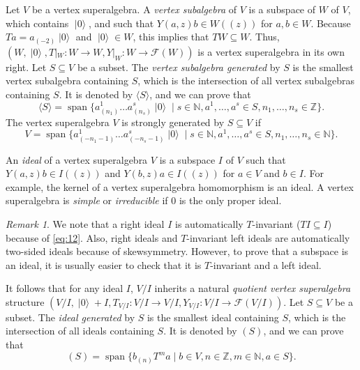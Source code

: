 \documentclass[a4paper, 12pt, reqno]{amsart}
\theoremstyle{remark}
\newtheorem{remark}[theorem]{Remark}
\numberwithin{equation}{subsection}
\DeclareMathOperator{\vspan}{span}
\DeclareMathOperator{\vac}{|0\rangle}
\begin{document}
Let $V$ be a vertex superalgebra.
A \emph{vertex subalgebra} of $V$ is a subspace of $W$ of $V$, which contains $\vac$, and such that $Y(a, z)b \in W((z))$ for $a, b \in W$.
Because $Ta = a_{(-2)}\vac$ and $\vac \in W$, this implies that $TW \subseteq W$.
Thus, $(W, \vac, T|_{W}: W \to W, Y|_{W}: W \to \mathcal{F}(W))$ is a vertex superalgebra in its own right.
Let $S \subseteq V$ be a subset.
The \emph{vertex subalgebra generated} by $S$ is the smallest vertex subalgebra containing $S$, which is the intersection of all vertex subalgebras containing $S$.
It is denoted by $\langle S \rangle$, and we can prove that
\begin{equation*}
  \langle S \rangle = \vspan\{a^1_{(n_1)}\dots a^s_{(n_s)}\vac \mid s \in \mathbb{N}, a^1, \dots, a^s \in S, n_1, \dots, n_s \in \mathbb{Z}\}.
\end{equation*}
The vertex superalgebra $V$ is strongly generated by $S \subseteq V$ if
\begin{equation*}
  V = \vspan\{a^1_{(-n_1 - 1)}\dots a^s_{(-n_s - 1)}\vac \mid s \in \mathbb{N}, a^1, \dots, a^s \in S, n_1, \dots, n_s \in \mathbb{N}\}.
\end{equation*}

An \emph{ideal} of a vertex superalgebra $V$ is a subspace $I$ of $V$ such that $Y(a, z)b \in I((z))$ and $Y(b, z)a \in I((z))$ for $a \in V$ and $b \in I$.
For example, the kernel of a vertex superalgebra homomorphism is an ideal.
A vertex superalgebra is \emph{simple} or \emph{irreducible} if $0$ is the only proper ideal.

\begin{remark}
  \label{rmk:13}
  We note that a right ideal $I$ is automatically $T$-invariant ($TI \subseteq I$) because of \eqref{eq:12}.
  Also, right ideals and $T$-invariant left ideals are automatically two-sided ideals because of skewsymmetry.
  However, to prove that a subspace is an ideal, it is usually easier to check that it is $T$-invariant and a left ideal.
\end{remark}

It follows that for any ideal $I$, $V/I$ inherits a natural \emph{quotient vertex superalgebra} structure $(V/I, \vac + I, T_{V/I}: V/I \to V/I, Y_{V/I}: V/I \to \mathcal{F}(V/I))$.
Let $S \subseteq V$ be a subset.
The \emph{ideal generated} by $S$ is the smallest ideal containing $S$, which is the intersection of all ideals containing $S$.
It is denoted by $(S)$, and we can prove that
\begin{equation*}
  (S) = \vspan\{b_{(n)}T^ma \mid b \in V, n \in \mathbb{Z}, m \in \mathbb{N}, a \in S\}.
\end{equation*}
\end{document}
